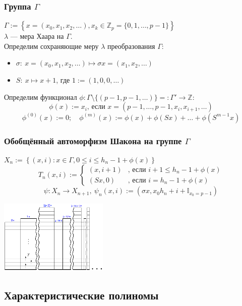 \begin{frame}
    \frametitle{Группа $\Gamma$}
    $\Gamma := \left\{x = \left(x_0, x_1, x_2, \ldots \right), x_k \in \mathbb{Z}_p=\{0, 1, \ldots, p - 1\} \right\}$\\
    $\lambda$ --- мера Хаара на $\Gamma$. \\
    Определим сохраняющие меру $\lambda$ преобразования $\Gamma$:\\
    \begin{itemize}
    \item $\sigma:\ x=\left(x_0, x_1, x_2, \ldots \right) \mapsto \sigma x = \left(x_1, x_2, \ldots \right)$
    \item $S:\ x \mapsto x + 1$, где $1:=(1,0,0,\ldots)$
    \end{itemize}
    Определим функционал $\phi: \Gamma \setminus \{(p-1,p-1,\ldots)\} =: \Gamma' \rightarrow \mathbb{Z}$:\\
    \[\phi(x):=x_i\text{, если }x=(p-1, \ldots, p-1, x_i, x_{i+1}, \ldots)\]
    \[\phi^{(0)}(x):=0;\quad \phi^{(m)}(x):=\phi(x)+\phi(Sx)+\ldots+\phi(S^{m-1}x)\]
\end{frame}

\begin{frame}
    \frametitle{Обобщённый автоморфизм Шакона на группе $\Gamma$}  
    $X_n := \left\{(x, i): x \in \Gamma, 0 \le i \le h_n - 1 + \phi(x)\right\}$\\    
    \[
        T_n(x, i):= \begin{cases} 
            (x, i+1) & \text{, если } i+1 \le h_n-1+\phi(x)\\
            (Sx, 0) & \text{, если } i = h_n - 1 + \phi(x)
            \end{cases}
    \]
    \[\psi: X_n \rightarrow X_{n+1},\ \psi_n(x, i) := (\sigma x, x_0 h_n + i + \mathbb{I}_{x_0 = p-1})\]
  \begin{center}
  \includegraphics[height=35mm]{gen_stack.png}
  \end{center}
\end{frame}


\subsection{Характеристические полиномы}


